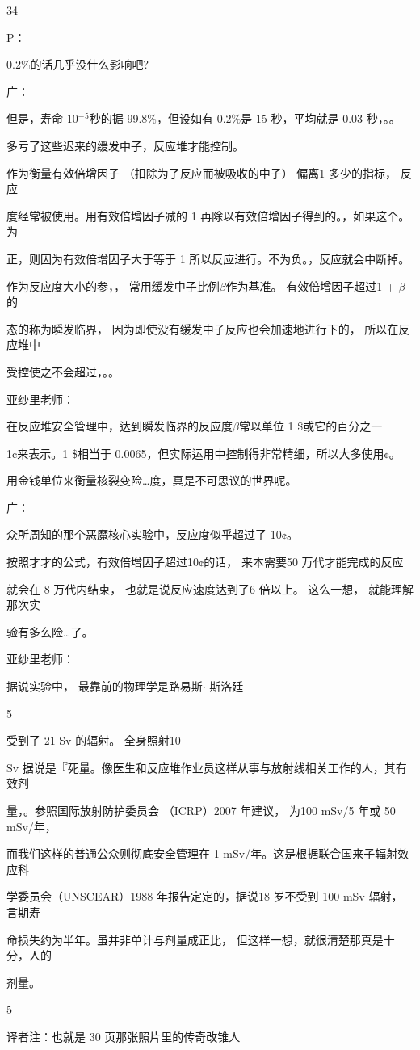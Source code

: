 34\par
P：\par
0.2\%的话几乎没什么影响吧?\par
广：\par
但是，寿命 10$^{-}$$^{5}$秒的据 99.8\%，但设如有 0.2\%是 15 秒，平均就是 0.03 秒，。。\par
多亏了这些迟来的缓发中子，反应堆才能控制。\par
作为衡量有效倍增因子 （扣除为了反应而被吸收的中子） 偏离1 多少的指标， 反应\par
度经常被使用。用有效倍增因子减的 1 再除以有效倍增因子得到的。，如果这个。为\par
正，则因为有效倍增因子大于等于 1 所以反应进行。不为负。，反应就会中断掉。\par
作为反应度大小的参，， 常用缓发中子比例$\beta$作为基准。 有效倍增因子超过1 + $\beta$的\par
态的称为瞬发临界， 因为即使没有缓发中子反应也会加速地进行下的， 所以在反应堆中\par
受控使之不会超过，。。\par
亚纱里老师：\par
在反应堆安全管理中，达到瞬发临界的反应度$\beta$常以单位 1 \$或它的百分之一\par
1¢来表示。1 \$相当于 0.0065，但实际运用中控制得非常精细，所以大多使用¢。\par
用金钱单位来衡量核裂变险…度，真是不可思议的世界呢。\par
广：\par
众所周知的那个恶魔核心实验中，反应度似乎超过了 10¢。\par
按照才才的公式，有效倍增因子超过10¢的话， 来本需要50 万代才能完成的反应\par
就会在 8 万代内结束， 也就是说反应速度达到了6 倍以上。 这么一想， 就能理解那次实\par
验有多么险…了。\par
亚纱里老师：\par
据说实验中， 最靠前的物理学是路易斯$\cdot$ 斯洛廷\par
5\par
受到了 21 Sv 的辐射。 全身照射10\par
Sv 据说是『死量。像医生和反应堆作业员这样从事与放射线相关工作的人，其有效剂\par
量，。参照国际放射防护委员会 （ICRP）2007 年建议， 为100 mSv/5 年或 50 mSv/年，\par
而我们这样的普通公众则彻底安全管理在 1 mSv/年。这是根据联合国来子辐射效应科\par
学委员会（UNSCEAR）1988 年报告定定的，据说18 岁不受到 100 mSv 辐射，言期寿\par
命损失约为半年。虽并非单计与剂量成正比， 但这样一想，就很清楚那真是十分，人的\par
剂量。\par
5\par
译者注：也就是 30 页那张照片里的传奇改锥人\par

